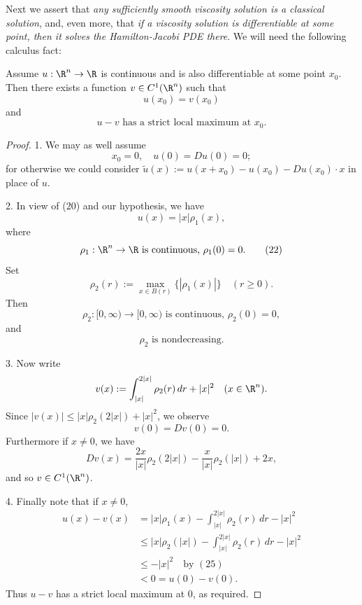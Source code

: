 Next we assert that \textit{any sufficiently smooth viscosity solution is a classical solution}, and, even more, that \textit{if a viscosity solution is differentiable at some point, then it solves the Hamilton-Jacobi PDE there}. We will need the following calculus fact:

\begin{lemma}
\label{lem:touching-by-c1-function}
Assume $u : \R^n \to \R$ is continuous and is also differentiable at some point $x_0$. Then there exists a function $v \in C^1(\R^n)$ such that
\[
u(x_0) = v(x_0)
\tag{18}
\]
and
\[
u - v \text{ has a strict local maximum at } x_0.
\tag{19}
\]
\end{lemma}
\begin{proof}
1. We may as well assume
\[
x_0 = 0, \quad u(0) = Du(0) = 0;
\tag{20}
\]
for otherwise we could consider $\tilde{u}(x) := u(x + x_0) - u(x_0) - Du(x_0) \cdot x$ in place of $u$.

2. In view of (20) and our hypothesis, we have
\[
u(x) = |x| \rho_1(x),
\tag{21}
\]
where
\[
\rho_1 : \R^n \to \R \text{ is continuous, } \rho_1(0) = 0.
\tag{22}
\]
Set
\[
\rho_2(r) := \max_{x \in B(r)} \{|\rho_1(x)|\} \quad (r \geq 0).
\tag{23}
\]
Then
\[
\rho_2 : [0, \infty) \to [0, \infty) \text{ is continuous, } \rho_2(0) = 0,
\tag{24}
\]
and
\[
\rho_2 \text{ is nondecreasing.}
\tag{25}
\]

3. Now write
\[
v(x) := \int_{|x|}^{2|x|} \rho_2(r) \, dr + |x|^2 \quad (x \in \R^n).
\]
Since $|v(x)| \leq |x| \rho_2(2|x|) + |x|^2$, we observe
\[
v(0) = Dv(0) = 0.
\tag{26}
\]
Furthermore if $x \neq 0$, we have
\[
Dv(x) = \frac{2x}{|x|} \rho_2(2|x|) - \frac{x}{|x|} \rho_2(|x|) + 2x,
\]
and so $v \in C^1(\R^n)$.

4. Finally note that if $x \neq 0$,
\[
\begin{aligned}
u(x) - v(x) &= |x| \rho_1(x) - \int_{|x|}^{2|x|} \rho_2(r) \, dr - |x|^2 \\
&\leq |x| \rho_2(|x|) - \int_{|x|}^{2|x|} \rho_2(r) \, dr - |x|^2 \\
&\leq -|x|^2 \quad \text{by } (25) \\
&< 0 = u(0) - v(0).
\end{aligned}
\]
Thus $u - v$ has a strict local maximum at $0$, as required.
\end{proof}

